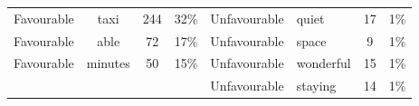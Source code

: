 \documentclass[a4paper, 12pt]{article}
\begin{document}
\begin{table}[htbp]
\begin{tabular}{ccccp{5.715em}p{4.715em}cc}
    \multicolumn{1}{p{4.715em}}{Favourable} & \multicolumn{1}{p{4.715em}}{taxi} & 244   & 32\%  & Unfavourable & quiet & 17    & 1\% \\
    \multicolumn{1}{p{4.715em}}{Favourable} & \multicolumn{1}{p{4.715em}}{able} & 72    & 17\%  & Unfavourable & space & 9     & 1\% \\
    \multicolumn{1}{p{4.715em}}{Favourable} & \multicolumn{1}{p{4.715em}}{minutes} & 50    & 15\%  & Unfavourable & wonderful & 15    & 1\% \\
          &       &       &       & Unfavourable & staying & 14    & 1\% \\
    \end{tabular}%
  \label{tab:addlabel}%
\end{table}%



	     
                    
\end{document}
